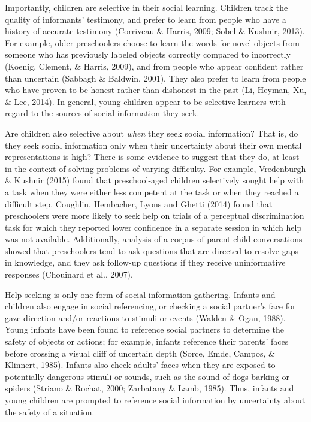 \documentclass[a4paper,man,apacite,floatsintext]{apa6}
\begin{document}
Importantly, children are selective in their social learning. Children
track the quality of informants' testimony, and prefer to learn from
people who have a history of accurate testimony (Corriveau \& Harris,
2009; Sobel \& Kushnir, 2013). For example, older preschoolers choose to
learn the words for novel objects from someone who has previously
labeled objects correctly compared to incorrectly (Koenig, Clement, \&
Harris, 2009), and from people who appear confident rather than
uncertain (Sabbagh \& Baldwin, 2001). They also prefer to learn from
people who have proven to be honest rather than dishonest in the past
(Li, Heyman, Xu, \& Lee, 2014). In general, young children appear to be
selective learners with regard to the sources of social information they
seek.

Are children also selective about \emph{when} they seek social
information? That is, do they seek social information only when their
uncertainty about their own mental representations is high? There is
some evidence to suggest that they do, at least in the context of
solving problems of varying difficulty. For example, Vredenburgh \&
Kushnir (2015) found that preschool-aged children selectively sought
help with a task when they were either less competent at the task or
when they reached a difficult step. Coughlin, Hembacher, Lyons and
Ghetti (2014) found that preschoolers were more likely to seek help on
trials of a perceptual discrimination task for which they reported lower
confidence in a separate session in which help was not available.
Additionally, analysis of a corpus of parent-child conversations showed
that preschoolers tend to ask questions that are directed to resolve
gaps in knowledge, and they ask follow-up questions if they receive
uninformative responses (Chouinard et al., 2007).

Help-seeking is only one form of social information-gathering. Infants
and children also engage in social referencing, or checking a social
partner's face for gaze direction and/or reactions to stimuli or events
(Walden \& Ogan, 1988). Young infants have been found to reference
social partners to determine the safety of objects or actions; for
example, infants reference their parents' faces before crossing a visual
cliff of uncertain depth (Sorce, Emde, Campos, \& Klinnert, 1985).
Infants also check adults' faces when they are exposed to potentially
dangerous stimuli or sounds, such as the sound of dogs barking or
spiders (Striano \& Rochat, 2000; Zarbatany \& Lamb, 1985). Thus,
infants and young children are prompted to reference social information
by uncertainty about the safety of a situation.
\end{document}
